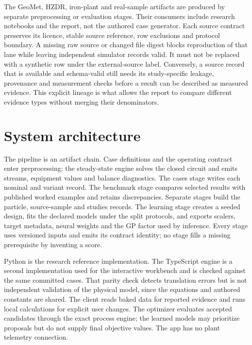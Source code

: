 \documentclass[10pt]{article}
\begin{document}
The GeoMet, HZDR, iron-plant and real-sample artifacts are produced by
separate preprocessing or evaluation stages. Their consumers include
research notebooks and the report, not the authored case generator. Each
source contract preserves its licence, stable source reference, row
exclusions and protocol boundary. A missing raw source or changed file
digest blocks reproduction of that lane while leaving independent
simulator records valid. It must not be replaced with a synthetic row
under the external-source label. Conversely, a source record that is
available and schema-valid still needs its study-specific leakage,
provenance and measurement checks before a result can be described as
measured evidence. This explicit lineage is what allows the report to
compare different evidence types without merging their denominators.

\section{System architecture}\label{system-architecture}

The pipeline is an artifact chain. Case definitions and the operating
contract enter preprocessing; the steady-state engine solves the closed
circuit and emits streams, equipment values and balance diagnostics. The
cases stage writes each nominal and variant record. The benchmark stage
compares selected results with published worked examples and retains
discrepancies. Separate stages build the particle, source-sample and
studies records. The learning stage creates a seeded design, fits the
declared models under the split protocols, and exports scalers, target
metadata, neural weights and the GP factor used by inference. Every
stage uses versioned inputs and emits its contract identity; no stage
fills a missing prerequisite by inventing a score.

Python is the research reference implementation. The TypeScript engine
is a second implementation used for the interactive workbench and is
checked against the same committed cases. That parity check detects
translation errors but is not independent validation of the physical
model, since the equations and authored constants are shared. The client
reads baked data for reported evidence and runs local calculations for
explicit user changes. The optimizer evaluates accepted candidates
through the exact process engine; the learned models may prioritize
proposals but do not supply final objective values. The app has no plant
telemetry connection.
\end{document}
